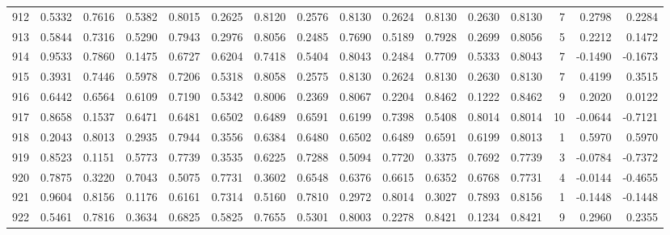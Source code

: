 \begin{tabular}{lrrrrrrrrrrrrrrr}
912 &      0.5332 &  0.7616 &  0.5382 &  0.8015 &  0.2625 &  0.8120 &  0.2576 &  0.8130 &  0.2624 &  0.8130 &   0.2630 &     0.8130 &      7 &                    0.2798 &                     0.2284 \\
913 &      0.5844 &  0.7316 &  0.5290 &  0.7943 &  0.2976 &  0.8056 &  0.2485 &  0.7690 &  0.5189 &  0.7928 &   0.2699 &     0.8056 &      5 &                    0.2212 &                     0.1472 \\
914 &      0.9533 &  0.7860 &  0.1475 &  0.6727 &  0.6204 &  0.7418 &  0.5404 &  0.8043 &  0.2484 &  0.7709 &   0.5333 &     0.8043 &      7 &                   -0.1490 &                    -0.1673 \\
915 &      0.3931 &  0.7446 &  0.5978 &  0.7206 &  0.5318 &  0.8058 &  0.2575 &  0.8130 &  0.2624 &  0.8130 &   0.2630 &     0.8130 &      7 &                    0.4199 &                     0.3515 \\
916 &      0.6442 &  0.6564 &  0.6109 &  0.7190 &  0.5342 &  0.8006 &  0.2369 &  0.8067 &  0.2204 &  0.8462 &   0.1222 &     0.8462 &      9 &                    0.2020 &                     0.0122 \\
917 &      0.8658 &  0.1537 &  0.6471 &  0.6481 &  0.6502 &  0.6489 &  0.6591 &  0.6199 &  0.7398 &  0.5408 &   0.8014 &     0.8014 &     10 &                   -0.0644 &                    -0.7121 \\
918 &      0.2043 &  0.8013 &  0.2935 &  0.7944 &  0.3556 &  0.6384 &  0.6480 &  0.6502 &  0.6489 &  0.6591 &   0.6199 &     0.8013 &      1 &                    0.5970 &                     0.5970 \\
919 &      0.8523 &  0.1151 &  0.5773 &  0.7739 &  0.3535 &  0.6225 &  0.7288 &  0.5094 &  0.7720 &  0.3375 &   0.7692 &     0.7739 &      3 &                   -0.0784 &                    -0.7372 \\
920 &      0.7875 &  0.3220 &  0.7043 &  0.5075 &  0.7731 &  0.3602 &  0.6548 &  0.6376 &  0.6615 &  0.6352 &   0.6768 &     0.7731 &      4 &                   -0.0144 &                    -0.4655 \\
921 &      0.9604 &  0.8156 &  0.1176 &  0.6161 &  0.7314 &  0.5160 &  0.7810 &  0.2972 &  0.8014 &  0.3027 &   0.7893 &     0.8156 &      1 &                   -0.1448 &                    -0.1448 \\
922 &      0.5461 &  0.7816 &  0.3634 &  0.6825 &  0.5825 &  0.7655 &  0.5301 &  0.8003 &  0.2278 &  0.8421 &   0.1234 &     0.8421 &      9 &                    0.2960 &                     0.2355 \\

\end{tabular}
